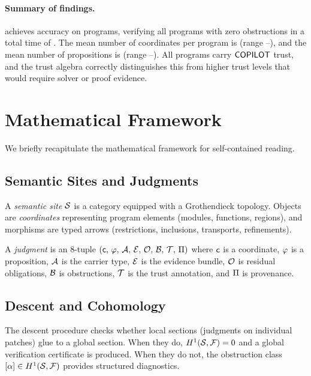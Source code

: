 \documentclass[11pt]{article}
\newcommand{\Sect}{\mathcal{F}}             %
\begin{document}
\paragraph{Summary of findings.}
\JuGeo{} achieves \expAccuracy{} accuracy on
\expTotalPrograms{} programs, verifying all \expVerified{} programs
with zero obstructions in a total time of \expTimeTotal{}.  The
mean number of coordinates per program is \expCoordsMean{}
(range \expCoordsMin{}--\expCoordsMax{}), and the mean number of
propositions is \expPropsMean{}
(range \expPropsMin{}--\expPropsMax{}).  All programs carry
$\mathsf{COPILOT}$ trust, and the trust algebra correctly distinguishes
this from higher trust levels that would require solver or proof
evidence.

\section{Mathematical Framework}\label{sec:framework}

We briefly recapitulate the mathematical framework for self-contained
reading.

\subsection{Semantic Sites and Judgments}

A \emph{semantic site} $\mathcal{S}$ is a category equipped with a
Grothendieck topology.  Objects are \emph{coordinates} representing
program elements (modules, functions, regions), and morphisms are
typed arrows (restrictions, inclusions, transports, refinements).

A \emph{judgment} is an 8-tuple $(\mathsf{c},\,\varphi,\,\mathcal{A},\,\mathcal{E},\,\mathcal{O},\,\mathcal{B},\,\mathcal{T},\,\Pi)$
where $\mathsf{c}$ is a coordinate, $\varphi$ is a proposition,
$\mathcal{A}$ is the carrier type, $\mathcal{E}$ is the evidence bundle,
$\mathcal{O}$ is residual obligations, $\mathcal{B}$ is obstructions,
$\mathcal{T}$ is the trust annotation, and $\Pi$ is provenance.

\subsection{Descent and Cohomology}

The descent procedure checks whether local sections (judgments on
individual patches) glue to a global section.  When they do,
$\Hcoh{1}(\Site, \Sect) = 0$ and a global verification certificate
is produced.  When they do not, the obstruction class
$[\alpha] \in \Hcoh{1}(\Site, \Sect)$ provides structured
diagnostics.
\end{document}
